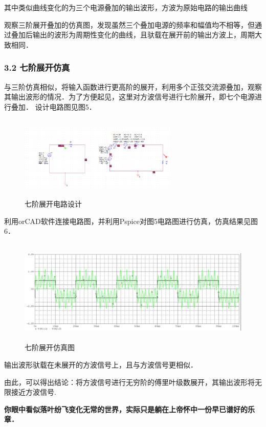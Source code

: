 \documentclass[]{article}
\begin{document}
其中类似曲线变化的为三个电源叠加的输出波形，方波为原始电路的输出曲线

观察三阶展开叠加的仿真图，发现虽然三个叠加电源的频率和幅值均不相等，但通过叠加后输出的波形为周期性变化的曲线，且驮载在展开前的输出方波上，周期大致相同．

\subsubsection*{3.2 七阶展开仿真}
与三阶仿真相似，将输入函数进行更高阶的展开，利用多个正弦交流源叠加，观察其输出波形的情况．为了方便起见，这里对方波信号进行七阶展开，即七个电源进行叠加．
设计电路图见图5．

\begin{figure}[htbp]
	\centering
	\includegraphics[height=4.0cm,width=7.5cm]{pics/5.png}%
	\caption{七阶展开电路设计}
\end{figure}

利用orCAD软件连接电路图，并利用Pspice对图5电路图进行仿真，仿真结果见图6．

\begin{figure}[htbp]
	\centering
	\includegraphics[height=5.0cm,width=12cm]{pics/7fangzhen.png}%
	\caption{七阶展开仿真图}
\end{figure}

输出波形驮载在未展开的方波信号上，且与方波信号更相似．

由此，可以得出结论：将方波信号进行无穷阶的傅里叶级数展开，其输出波形将无限接近方波信号.

\textbf{你眼中看似落叶纷飞变化无常的世界，实际只是躺在上帝怀中一份早已谱好的乐章．}
\end{document}
